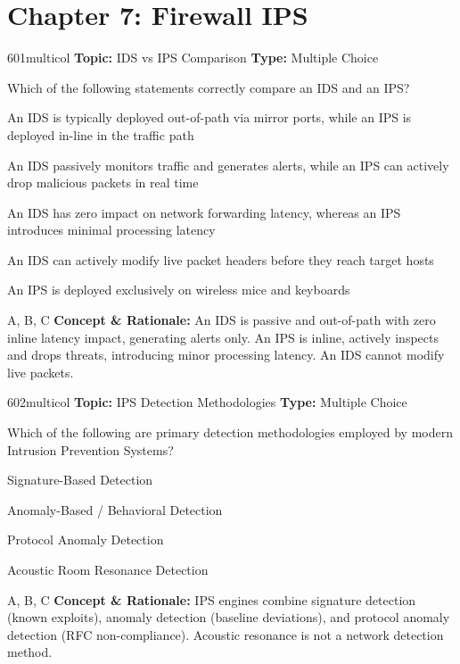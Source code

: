 \section{Chapter 7: Firewall IPS}

\begin{qcard}{601}{multicol}
\textcolor{darkslate!75}{\small\textbf{Topic:} IDS vs IPS Comparison \hfill \textbf{Type:} Multiple Choice}\vspace{0.4em}\par
Which of the following statements correctly compare an IDS and an IPS?
\begin{qoptions}
\item An IDS is typically deployed out-of-path via mirror ports, while an IPS is deployed in-line in the traffic path
\item An IDS passively monitors traffic and generates alerts, while an IPS can actively drop malicious packets in real time
\item An IDS has zero impact on network forwarding latency, whereas an IPS introduces minimal processing latency
\item An IDS can actively modify live packet headers before they reach target hosts
\item An IPS is deployed exclusively on wireless mice and keyboards
\end{qoptions}
\end{qcard}
\nopagebreak
\begin{explainbox}{A, B, C}
\textbf{Concept \& Rationale:} An IDS is passive and out-of-path with zero inline latency impact, generating alerts only. An IPS is inline, actively inspects and drops threats, introducing minor processing latency. An IDS cannot modify live packets.
\end{explainbox}

\begin{qcard}{602}{multicol}
\textcolor{darkslate!75}{\small\textbf{Topic:} IPS Detection Methodologies \hfill \textbf{Type:} Multiple Choice}\vspace{0.4em}\par
Which of the following are primary detection methodologies employed by modern Intrusion Prevention Systems?
\begin{qoptions}
\item Signature-Based Detection
\item Anomaly-Based / Behavioral Detection
\item Protocol Anomaly Detection
\item Acoustic Room Resonance Detection
\end{qoptions}
\end{qcard}
\nopagebreak
\begin{explainbox}{A, B, C}
\textbf{Concept \& Rationale:} IPS engines combine signature detection (known exploits), anomaly detection (baseline deviations), and protocol anomaly detection (RFC non-compliance). Acoustic resonance is not a network detection method.
\end{explainbox}

